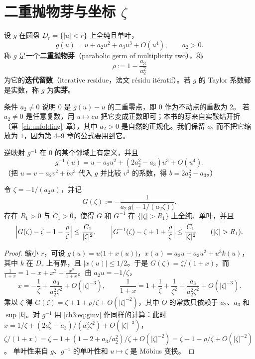 \section{二重抛物芽与坐标 \texorpdfstring{$\zeta$}{zeta}}\label{ch3:sec:germ}

\begin{definition}[二重抛物芽]\label{ch3:def:germ}
设 $g$ 在圆盘 $D_r=\{|u|<r\}$ 上全纯且单叶，
\[
 g(u)=u+a_2u^2+a_3u^3+O(u^4),\qquad a_2>0 .
\]
称 $g$ 是一个\textbf{二重抛物芽}（parabolic germ of multiplicity two），称
\[
 \rho:=1-\frac{a_3}{a_2^2}
\]
为它的\textbf{迭代留数}（iterative residue，法文 résidu itératif）。若 $g$ 的 Taylor
系数都是实数，称 $g$ 为\textbf{实芽}。
\end{definition}

条件 $a_2\ne0$ 说明 $0$ 是 $g(u)-u$ 的二重零点，即 $0$ 作为不动点的重数为 $2$。
若 $a_2\ne0$ 是任意复数，用 $u\mapsto cu$ 把它变成正数即可；本书的芽来自实鞍结开折
（第~\ref{ch:unfolding}~章），其中 $a_2>0$ 是自然的正规化。我们保留 $a_2$ 而不把它缩放为
$1$，因为第 4--9 章的公式要用到它。

逆映射 $g^{-1}$ 在 $0$ 的某个邻域上有定义，并且
\begin{equation}\label{ch3:eq:ginv}
 g^{-1}(u)=u-a_2u^2+(2a_2^2-a_3)u^3+O(u^4).
\end{equation}
（把 $u=v-a_2v^2+bv^3$ 代入 $g$ 并比较 $v^3$ 的系数，得 $b=2a_2^2-a_3$。）

\begin{lemma}[坐标 $\zeta$]\label{ch3:lem:zeta}
令 $\zeta=-1/(a_2u)$，并记
\[
 G(\zeta):=-\frac{1}{a_2\,g\bigl(-1/(a_2\zeta)\bigr)} .
\]
存在 $R_1>0$ 与 $C_1>0$，使得 $G$ 和 $G^{-1}$ 在 $\{|\zeta|>R_1\}$ 上全纯、单叶，并且
\begin{equation}\label{ch3:eq:G}
 \Bigl|G(\zeta)-\zeta-1-\frac{\rho}{\zeta}\Bigr|\le\frac{C_1}{|\zeta|^2},\qquad
 \Bigl|G^{-1}(\zeta)-\zeta+1+\frac{\rho}{\zeta}\Bigr|\le\frac{C_1}{|\zeta|^2}
 \qquad(|\zeta|>R_1).
\end{equation}
\end{lemma}

\begin{proof}
缩小 $r$，可设 $g(u)=u\bigl(1+x(u)\bigr)$，$x(u)=a_2u+a_3u^2+u^3k(u)$，其中 $k$ 在
$D_r$ 上有界，且 $|x(u)|\le1/2$。于是
$G(\zeta)=\zeta/(1+x)$，而
$\frac{1}{1+x}=1-x+x^2-\frac{x^3}{1+x}$。由 $a_2u=-1/\zeta$，
\[
 x=-\frac1\zeta+\frac{a_3}{a_2^2\zeta^2}+O(|\zeta|^{-3}),\qquad
 \frac1{1+x}=1+\frac1\zeta+\frac{1}{\zeta^2}-\frac{a_3}{a_2^2\zeta^2}+O(|\zeta|^{-3}).
\]
乘以 $\zeta$ 得 $G(\zeta)=\zeta+1+\rho/\zeta+O(|\zeta|^{-2})$，其中 $O$ 的常数只依赖于
$a_2$、$a_3$ 和 $\sup|k|$。对 $g^{-1}$ 用 \eqref{ch3:eq:ginv} 作同样的计算：此时
$x=1/\zeta+(2a_2^2-a_3)/(a_2^2\zeta^2)+O(|\zeta|^{-3})$，
$\zeta/(1+x)=\zeta-1+(1-2+a_3/a_2^2)/\zeta+O(|\zeta|^{-2})=\zeta-1-\rho/\zeta+O(|\zeta|^{-2})$。
单叶性来自 $g$、$g^{-1}$ 的单叶性和 $u\mapsto\zeta$ 是 Möbius 变换。
\end{proof}

